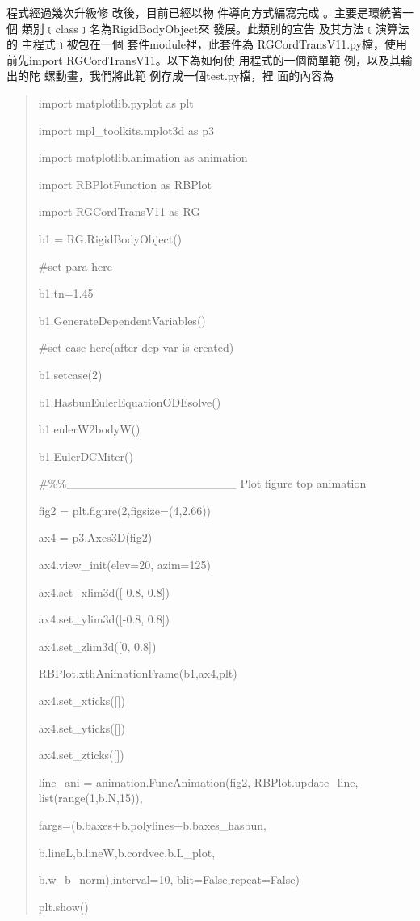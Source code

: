 \documentclass[12pt,twoside]{article}
\begin{document}
程式經過幾次升級修%
改後，目前已經以物%
件導向方式編寫完成%
。主要是環繞著一個%
類別﹝class﹞名為RigidBodyObject來%
發展。此類別的宣告%
及其方法﹝演算法的%
主程式﹞被包在一個%
套件module裡，此套件為%
RGCordTransV11.py檔，使用前先import
RGCordTransV11。以下為如何使%
用程式的一個簡單範%
例，以及其輸出的陀%
螺動畫，我們將此範%
例存成一個test.py檔，裡%
面的內容為

\begin{quotation}
import matplotlib.pyplot as plt

import mpl\_toolkits.mplot3d as p3

import matplotlib.animation as animation

import RBPlotFunction as RBPlot

import RGCordTransV11 as RG

b1 = RG.RigidBodyObject()

\#set para here

b1.tn=1.45

b1.GenerateDependentVariables()

\#set case here(after dep var is created)

b1.setcase(2)

b1.HasbunEulerEquationODEsolve()

b1.eulerW2bodyW()

b1.EulerDCMiter()

\#\%\%\_\_\_\_\_\_\_\_\_\_\_\_\_\_\_\_\_\_\_\_ Plot figure top animation

fig2 = plt.figure(2,figsize=(4,2.66))

ax4 = p3.Axes3D(fig2)

ax4.view\_init(elev=20, azim=125)

ax4.set\_xlim3d([-0.8, 0.8])

ax4.set\_ylim3d([-0.8, 0.8])

ax4.set\_zlim3d([0, 0.8])

RBPlot.xthAnimationFrame(b1,ax4,plt)

ax4.set\_xticks([])

ax4.set\_yticks([])

ax4.set\_zticks([])

line\_ani = animation.FuncAnimation(fig2, RBPlot.update\_line,
list(range(1,b.N,15)),

fargs=(b.baxes+b.polylines+b.baxes\_hasbun,

b.lineL,b.lineW,b.cordvec,b.L\_plot,

b.w\_b\_norm),interval=10, blit=False,repeat=False)

plt.show()
\end{quotation}
\end{document}
